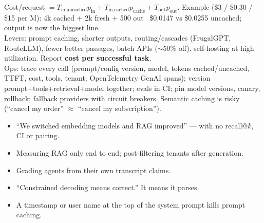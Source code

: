 \begin{qa}
\end{qa}

\begin{mem}
Cost/request $=T_\text{in,uncached}p_\text{in}+T_\text{in,cached}p_\text{cache}+T_\text{out}p_\text{out}$. Example (\$3 / \$0.30 / \$15 per M): 4k cached + 2k fresh + 500 out \ra\ \$0.0147 vs \$0.0255 uncached; output is now the biggest line.\\[2pt]
Levers: prompt caching, shorter outputs, routing/cascades (FrugalGPT, RouteLLM), fewer better passages, batch APIs ($\sim$50\% off), self-hosting at high utilization. Report \textbf{cost per successful task}.\\[2pt]
Ops: trace every call (prompt/config version, model, tokens cached/uncached, TTFT, cost, tools, tenant; OpenTelemetry GenAI spans); version prompt+tools+retrieval+model together; evals in CI; pin model versions, canary, rollback; fallback providers with circuit breakers. Semantic caching is risky (``cancel my order'' $\approx$ ``cancel my subscription'').
\end{mem}

\begin{trap}
\begin{itemize}
\item ``We switched embedding models and RAG improved'' --- with no recall@$k$, CI or pairing.
\item Measuring RAG only end to end; post-filtering tenants after generation.
\item Grading agents from their own transcript claims.
\item ``Constrained decoding means correct.'' It means it parses.
\item A timestamp or user name at the top of the system prompt kills prompt caching.
\end{itemize}
\end{trap}

